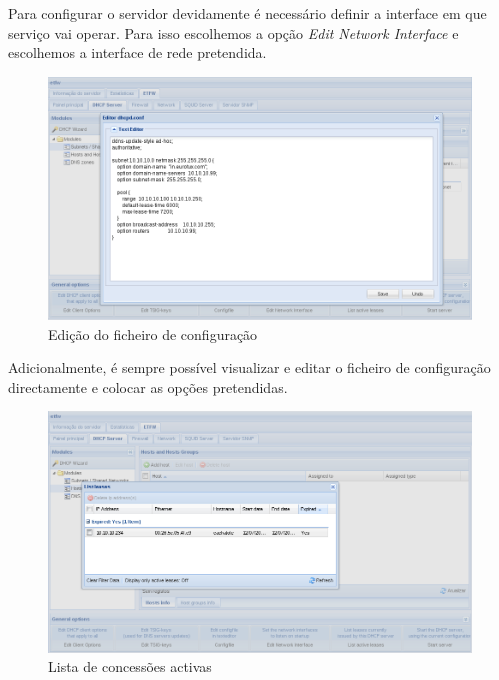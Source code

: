 Para configurar o servidor devidamente é necessário definir a interface em que serviço vai operar.
Para isso escolhemos a opção \textit{Edit Network Interface} e escolhemos a interface de rede pretendida.

\begin{figure}[H]
    \begin{center}
    \includegraphics[scale=0.38]{screenshots/etfw/etfw_dhcp_texteditor_01.png}
    \caption{Edição do ficheiro de configuração}
    \label{fig:etfw_dhcp_texteditor_01}
    \end{center}
\end{figure}

Adicionalmente, é sempre possível visualizar e editar o ficheiro de configuração directamente e colocar as opções pretendidas.

\begin{figure}[H]
    \begin{center}
    \includegraphics[scale=0.38]{screenshots/etfw/etfw_dhcp_leases_01.png}
    \caption{Lista de concessões activas}
    \label{fig:etfw_dhcp_leases_01}
    \end{center}
\end{figure}

